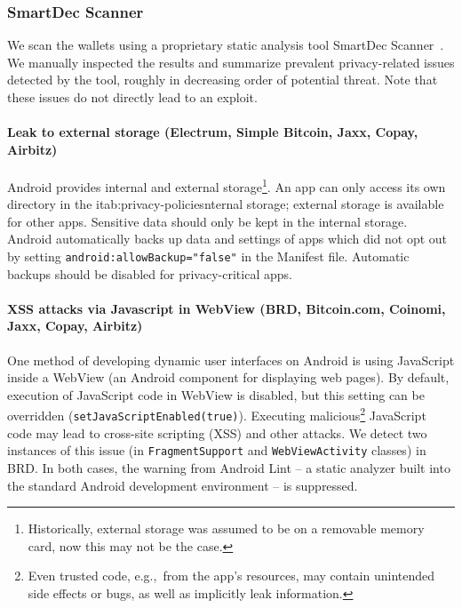 \subsubsection{SmartDec Scanner}
We scan the wallets using a proprietary static analysis tool SmartDec Scanner~\cite{SmartDec2018}.
We manually inspected the results and summarize prevalent privacy-related issues detected by the tool, roughly in decreasing order of potential threat.
Note that these issues do not directly lead to an exploit.

\paragraph{Leak to external storage (Electrum, Simple Bitcoin, Jaxx, Copay, Airbitz)}
Android provides internal and external storage\footnote{Historically, external storage was assumed to be on a removable memory card, now this may not be the case.}.
An app can only access its own directory in the itab:privacy-policiesnternal storage; external storage is available for other apps.
Sensitive data should only be kept in the internal storage.
Android automatically backs up data and settings of apps which did not opt out by setting \texttt{android:allowBackup="false"} in the Manifest file.
Automatic backups should be disabled for privacy-critical apps.

\paragraph{XSS attacks via Javascript in WebView (BRD, Bitcoin.com, Coinomi, Jaxx, Copay, Airbitz)}
One method of developing dynamic user interfaces on Android is using JavaScript inside a WebView (an Android component for displaying web pages).
By default, execution of JavaScript code in WebView is disabled, but this setting can be overridden (\texttt{setJavaScriptEnabled(true)}).
Executing malicious\footnote{Even trusted code, e.g.,~from the app's resources, may contain unintended side effects or bugs, as well as implicitly leak information.} JavaScript code may lead to cross-site scripting (XSS) and other attacks.
We detect two instances of this issue (in \texttt{FragmentSupport} and \texttt{WebViewActivity} classes) in BRD.
In both cases, the warning from Android Lint -- a static analyzer built into the standard Android development environment -- is suppressed.

